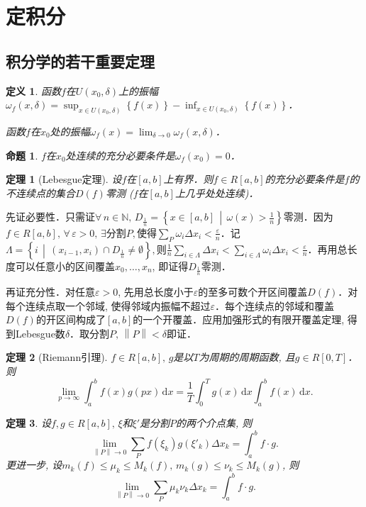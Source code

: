 \documentclass[11pt,a4paper]{ctexart}
\makeatletter
\theoremstyle{thmseries} %
\newtheorem{thm}{定理}[section]
\newtheorem{prop}{命题}[section]
\theoremstyle{exerseries}
\newtheorem{defn}{定义}[section]
\renewenvironment{proof}[1][\proofname]{\par
  \pushQED{\qed}%
  \normalfont \topsep6\p@\@plus6\p@\relax
  \trivlist
  \item[\hskip\labelsep
        \itshape
    #1\@addpunct{}]\ignorespaces
}{%
  \popQED\endtrivlist\@endpefalse
}
\newenvironment{pf}{\begin{proof}[\bfseries\upshape 证\quad]}{\end{proof}}
\newcommand{\cbra}[1]{\mathopen{}\left\{#1\right\}}
\renewcommand{\epsilon}{\varepsilon}
\newcommand{\N}{\mathbb{N}}
\renewcommand{\d}{\mathrm{d}}
\newcommand{\norm}[1]{\left\lVert#1\right\rVert}
\makeatother
\begin{document}
\section{定积分}
\subsection{积分学的若干重要定理}
\begin{defn}
	函数$f$在$U(x_0,\delta)$上的振幅$\omega_f(x,\delta)=\sup_{x\in U(x_0,\delta)}\cbra{f(x)}-\inf_{x\in U(x_0,\delta)}\cbra{f(x)}$．
	
	函数$f$在$x_0$处的振幅$\omega_f(x)=\lim_{\delta\to 0}\omega_f(x,\delta)$．
\end{defn}

\begin{prop}
	$f$在$x_0$处连续的充分必要条件是$\omega_f(x_0)=0$．
\end{prop}

\begin{thm}[Lebesgue定理]
	设$f$在$[a,b]$上有界．则$f\in R[a,b]$的充分必要条件是$f$的不连续点的集合$D(f)$零测 ($f$在$[a,b]$上几乎处处连续)．
\end{thm}
\begin{pf}
	先证必要性．只需证$\forall\,n\in\N,\,D_\frac{1}{n}=\cbra{x\in[a,b]\,\middle\vert\,\omega(x)>\frac{1}{n}}$零测．因为$f\in R[a,b],\,\forall\,\epsilon>0,\,\exists$分割$P,$使得$\sum_P\omega_i\Delta x_i<\frac{\epsilon}{n}$．记$\Lambda=\cbra{i\,\middle\vert\,(x_{i-1},x_i)\cap D_\frac{1}{n}\neq\emptyset},$则$\frac{1}{n}\sum_{i\in\Lambda}\Delta x_i<\sum_{i\in\Lambda}\omega_i\Delta x_i<\frac{\epsilon}{n}$．再用总长度可以任意小的区间覆盖$x_0,\dots,x_n$, 即证得$D_\frac{1}{n}$零测．

	再证充分性．对任意$\epsilon>0$, 先用总长度小于$\epsilon$的至多可数个开区间覆盖$D(f)$．对每个连续点取一个邻域, 使得邻域内振幅不超过$\epsilon$．每个连续点的邻域和覆盖$D(f)$的开区间构成了$[a,b]$的一个开覆盖．应用加强形式的有限开覆盖定理, 得到Lebesgue数$\delta$．取分割$P,\,\norm{P}<\delta$即证．
\end{pf}

\begin{thm}[Riemann引理]
	$f\in R[a,b],\,g$是以$T$为周期的周期函数, 且$g\in R[0,T]$．则
	\[\lim_{p\to\infty}\int_{a}^{b}f(x)g(px)\,\d x=\frac{1}{T}\int_{0}^{T}g(x)\,\d x\int_{a}^{b}f(x)\,\d x.\]
\end{thm}

\begin{thm}
	设$f,g\in R[a,b],\,\xi$和$\xi'$是分割$P$的两个介点集, 则
	\[\lim_{\norm{P}\to0}\sum_P f(\xi_k)g(\xi'_k)\Delta x_k=\int_{a}^{b}f\cdot g.\]
	更进一步, 设$m_k(f)\leq\mu_k\leq M_k(f),\,m_k(g)\leq\nu_k\leq M_k(g)$, 则
	\[\lim_{\norm{P}\to0}\sum_P \mu_k\nu_k\Delta x_k=\int_{a}^{b}f\cdot g.\]
\end{thm}
\end{document}

